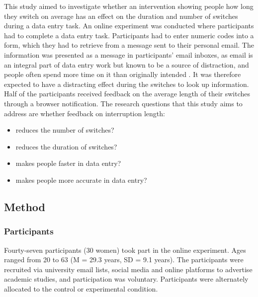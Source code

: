 This study aimed to investigate whether an intervention showing people how long they switch on average has an effect on the duration and number of switches during a data entry task. An online experiment was conducted where participants had to complete a data entry task. Participants had to enter numeric codes into a form, which they had to retrieve from a message sent to their personal email. The information was presented as a message in participants' email inboxes, as email is an integral part of data entry work but known to be a source of distraction, and people often spend more time on it than originally intended \citep{Hanrahan2015, Mark2016}. It was therefore expected to have a distracting effect during the switches to look up information. Half of the participants received feedback on the average length of their switches through a browser notification. 
The research questions that this study aims to address are whether feedback on interruption length:

\begin{itemize}
\item
reduces the number of switches?
\item
 reduces the duration of switches?
\item
makes people faster in data entry?
\item
makes people more accurate in data entry?
\end{itemize}

\subsection{Method}
\subsubsection{Participants}
Fourty-seven participants (30 women) took part in the online experiment. Ages ranged from 20 to 63 (M = 29.3 years, SD = 9.1 years). The participants were recruited via university email lists, social media and online platforms to advertise academic studies, and participation was voluntary. Participants were alternately allocated to the control or experimental condition.

